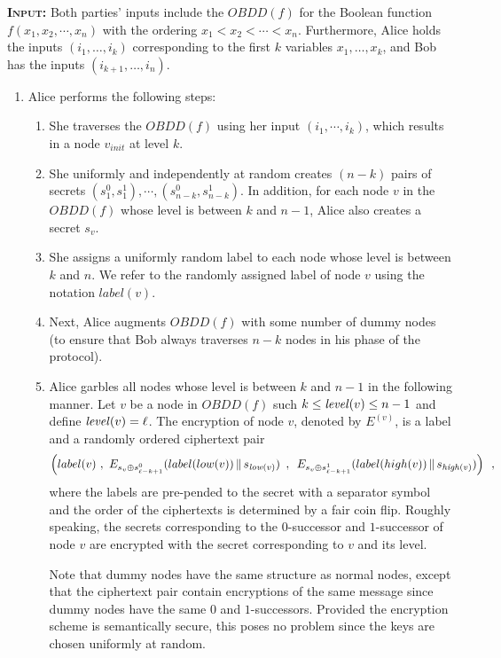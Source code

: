 \textsc{\bf Input:} Both parties' inputs include the $OBDD(f)$ for the Boolean function
$f(x_1,x_2,\cdots,x_n)$ with the ordering $x_1 < x_2 < \cdots < x_n$.
Furthermore, Alice holds the inputs $(i_1,\ldots,i_k)$ corresponding
to the first $k$ variables $x_1,\ldots,x_k$, and Bob has the inputs
$(i_{k+1},\ldots,i_n)$. 
\vspace{1ex}
\begin{enumerate}
\item Alice performs the following steps:
\begin{enumerate}
\item She traverses the $OBDD(f)$ using her
input $(i_1,\cdots,i_k)$, which results in a node $v_{init}$ at level
$k$.

\item She uniformly and independently at random creates $(n-k)$ pairs
of secrets $(s_1^0,s_1^1),\cdots,(s_{n-k}^0,s_{n-k}^1)$.  In addition,
for each node $v$ in the $OBDD(f)$ whose level is between $k$ and $n-1$,
Alice also creates a secret $s_v$. 

\item She assigns a uniformly random label to each node whose level is
between $k$ and $n$. We refer to the randomly assigned label of node
$v$ using the notation $label(v)$.

\item Next, Alice augments $OBDD(f)$ with some number of dummy nodes
(to ensure that Bob always traverses $n-k$ nodes in his phase of the protocol). 


\item Alice garbles all nodes whose level is between $k$ and $n-1$
in the following manner. Let $v$ be a node in $OBDD(f)$ such $k \leq
{\it level}(v) \leq n-1$ and define ${\it level}(v)=\ell$. The encryption of node $v$, denoted
by $E^{(v)}$, is a label and a randomly ordered ciphertext pair
\[
\left(label(v)\,\,,\,\,E_{s_v \oplus s_{\ell-k+1}^0} (label(low(v)) \,\|\, s_{{\it low}(v)})\,\,\,,\,\,\,
E_{s_v \oplus s_{\ell-k+1}^1} (label(high(v)) \,\|\, s_{{\it high}(v)})\right)\,\,\,,
\]
where the labels are pre-pended to the secret with a separator symbol
and the order of the ciphertexts is determined by a fair coin
flip. Roughly speaking, the secrets corresponding to the $0$-successor
and $1$-successor of node $v$ are encrypted with the secret
corresponding to $v$ and its level.

Note that dummy nodes have the same structure as normal nodes, except
that the ciphertext pair contain encryptions of the same message since
dummy nodes have the same $0$ and $1$-successors. Provided the
encryption scheme is semantically secure, this poses no problem since
the keys are chosen uniformly at random.


\end{enumerate}
\end{enumerate}
